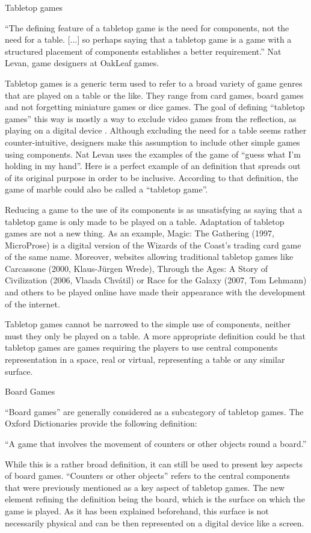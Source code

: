 Tabletop games

“The defining feature of a tabletop game is the need for components, not the need for a table. [...] so perhaps saying that a tabletop game is a game with a structured placement of components establishes a better requirement.” Nat Levan, game designers at OakLeaf games.

Tabletop games is a generic term used to refer to a broad variety of game genres that are played on a table or the like. They range from card games, board games and not forgetting miniature games or dice games. The goal of defining “tabletop games” this way is mostly a way to exclude video games from the reflection, as playing on a digital device . Although excluding the need for a table seems rather counter-intuitive, designers make this assumption to include other simple games using components. Nat Levan uses the examples of the game of “guess what I’m holding in my hand”. Here is a perfect example of an definition that spreads out of its original purpose in order to be inclusive. According to that definition, the game of marble could also be called a “tabletop game”. 

Reducing a game to the use of its components is as unsatisfying as saying that a tabletop game is only made to be played on a table. Adaptation of tabletop games are not a new thing. As an example, Magic: The Gathering (1997, MicroProse) is a digital version of the Wizards of the Coast’s trading card game of the same name. Moreover, websites allowing traditional tabletop games like Carcassone (2000, Klaus-Jürgen Wrede), Through the Ages: A Story of Civilization (2006, Vlaada Chvátil) or Race for the Galaxy (2007, Tom Lehmann) and others to be played online have made their appearance with the development of the internet. 

Tabletop games cannot be narrowed to the simple use of components, neither must they only be played on a table. A more appropriate definition could be that tabletop games are games requiring the players to use central components representation in a space, real or virtual, representing a table or any similar surface.

Board Games

“Board games” are generally considered as a subcategory of tabletop games. The Oxford Dictionaries provide the following definition:

“A game that involves the movement of counters or other objects round a board.”

While this is a rather broad definition, it can still be used to present key aspects of board games. “Counters or other objects” refers to the central components that were previously mentioned as a key aspect of tabletop games. The new element refining the definition being the board, which is the surface on which the game is played. As it has been explained beforehand, this surface is not necessarily physical and can be then represented on a digital device like a screen. 




